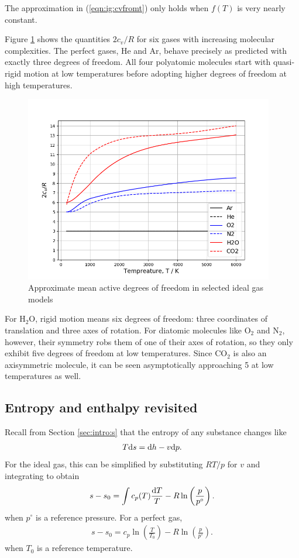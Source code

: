 The approximation in (\ref{eqn:ig:cvfromt}) only holds when $f(T)$ is very nearly constant. 

Figure \ref{fig:dof} shows the quantities $2 c_v / R$ for six gases with increasing molecular complexities.  The perfect gases, He and Ar, behave precisely as predicted with exactly three degrees of freedom.  All four polyatomic molecules start with quasi-rigid motion at low temperatures before adopting higher degrees of freedom at high temperatures.

\begin{figure}
\centering
\includegraphics[width=0.97\textwidth]{figures/dof}
\caption{Approximate mean active degrees of freedom in selected ideal gas models}\label{fig:dof}
\end{figure}

For H$_2$O, rigid motion means six degrees of freedom: three coordinates of translation and three axes of rotation.  For diatomic molecules like O$_2$ and N$_2$, however, their symmetry robs them of one of their axes of rotation, so they only exhibit five degrees of freedom at low temperatures.  Since CO$_2$ is also an axisymmetric molecule, it can be seen asymptotically approaching 5 at low temperatures as well.

\subsection{Entropy and enthalpy revisited}

Recall from Section \ref{sec:intro:s} that the entropy of any substance changes like
\begin{align}
T \mathrm{d} s = \mathrm{d} h - v \mathrm{d} p\nonumber.
\end{align}
For the ideal gas, this can be simplified by substituting $R T / p$ for $v$ and integrating to obtain
\begin{align}
s - s_0 = \int c_p(T)\frac{\mathrm{d} T}{T} - R \ln \left( \frac{p}{p^\circ} \right)\label{eqn:ig:s}.
\end{align}
when $p^\circ$ is a reference pressure.  For a perfect gas,
\begin{align}
s - s_0 = c_p \ln\left( \frac{T}{T_0} \right) - R \ln\left( \frac{p}{p^\circ} \right)\label{eqn:pg:s}.
\end{align}
when $T_0$ is a reference temperature.

